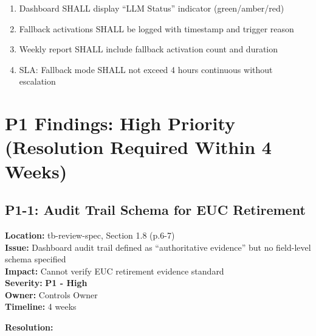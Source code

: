 \begin{enumerate}
    \item Dashboard SHALL display ``LLM Status'' indicator (green/amber/red)
    \item Fallback activations SHALL be logged with timestamp and trigger reason
    \item Weekly report SHALL include fallback activation count and duration
    \item SLA: Fallback mode SHALL not exceed 4 hours continuous without escalation
\end{enumerate}

\section{P1 Findings: High Priority (Resolution Required Within 4 Weeks)}
\label{sec:p1-findings}

\subsection{P1-1: Audit Trail Schema for EUC Retirement}
\label{sec:p1-audit-trail}

\begin{tcolorbox}[colback=orange!5,colframe=orange!70,title=\faIcon{exclamation-circle} Finding P1-1: Audit Trail Schema Not Defined]
\textbf{Location:} tb-review-spec, Section 1.8 (p.6-7)\\
\textbf{Issue:} Dashboard audit trail defined as ``authoritative evidence'' but no 
field-level schema specified\\
\textbf{Impact:} Cannot verify EUC retirement evidence standard\\
\textbf{Severity:} \textbf{P1 - High}\\
\textbf{Owner:} Controls Owner\\
\textbf{Timeline:} 4 weeks
\end{tcolorbox}

\textbf{Resolution:}

